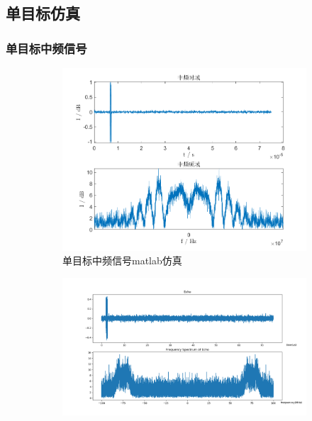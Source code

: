\documentclass{article}
\newcounter{sub}
\begin{document}
\subsection{单目标仿真}%
\label{sub:单目标仿真}

\subsubsection{单目标中频信号}%
\label{ssub:单目标中频信号}

\begin{figure}[H]
	\centering
	\begin{subfigure}[H]{.45\linewidth}
		\centering
		\includegraphics[width=\linewidth]{one-MF-matlab.png}
		\caption{单目标中频信号matlab仿真}
		\label{fig:单目标中频信号matlab仿真}
	\end{subfigure}
	\quad
	\begin{subfigure}[H]{.45\linewidth}
		\centering
		\includegraphics[width=\linewidth]{one-MF-software.png}

\end{subfigure}
\end{figure}
\end{document}
